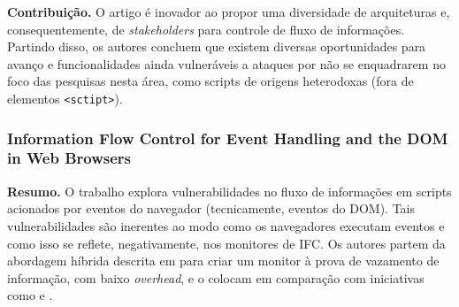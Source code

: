 \textbf{Contribuição.} O artigo é inovador ao propor uma diversidade de arquiteturas e, consequentemente, de \textit{stakeholders} para controle de fluxo de informações. Partindo disso, os autores concluem que existem diversas oportunidades para avanço e funcionalidades ainda vulneráveis a ataques por não se enquadrarem no foco das pesquisas nesta área, como scripts de origens heterodoxas (fora de elementos \texttt{<sctipt>}).


\subsubsection{Information Flow Control for Event Handling and the DOM in Web Browsers \cite{Rajani2015}}
\textbf{Resumo.} O trabalho explora vulnerabilidades no fluxo de informações em scripts acionados por eventos do navegador (tecnicamente, eventos do DOM). Tais vulnerabilidades são inerentes ao modo como os navegadores executam eventos e como isso se reflete, negativamente, nos monitores de IFC. Os autores partem da abordagem híbrida descrita em \cite{Bichhawat2014} para criar um monitor à prova de vazamento de informação, com baixo \textit{overhead}, e o colocam em comparação com iniciativas como \cite{Stefan2014} e \cite{Hedin2014}.
